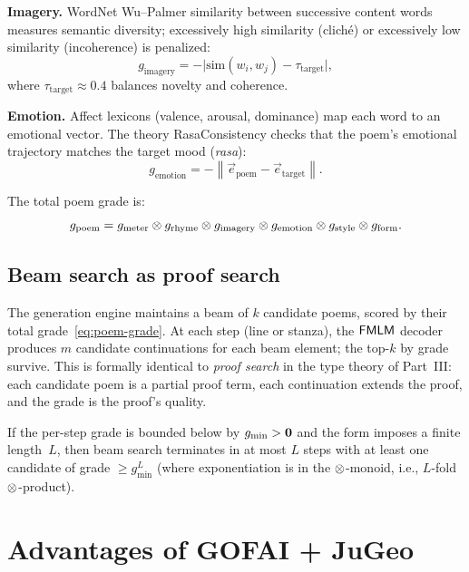\medskip\noindent\textbf{Imagery.}\;
WordNet Wu--Palmer similarity between successive content words
measures semantic diversity; excessively high similarity (clich\'e)
or excessively low similarity (incoherence) is penalized:
\[
  g_{\mathrm{imagery}} = -\bigl\lvert
    \mathrm{sim}(w_i, w_j) - \tau_{\mathrm{target}} \bigr\rvert,
\]
where $\tau_{\mathrm{target}} \approx 0.4$ balances novelty and
coherence.

\medskip\noindent\textbf{Emotion.}\;
Affect lexicons (valence, arousal, dominance) map each word to an
emotional vector.  The theory \textsf{RasaConsistency} checks that
the poem's emotional trajectory matches the target
mood (\emph{rasa}):
\[
  g_{\mathrm{emotion}} = -\left\lVert
    \vec{e}_{\mathrm{poem}} - \vec{e}_{\mathrm{target}}
  \right\rVert.
\]

The total poem grade is:
\begin{equation}
\label{eq:poem-grade}
  g_{\mathrm{poem}} = g_{\mathrm{meter}} \otimes g_{\mathrm{rhyme}}
    \otimes g_{\mathrm{imagery}} \otimes g_{\mathrm{emotion}}
    \otimes g_{\mathrm{style}} \otimes g_{\mathrm{form}}.
\end{equation}

\subsection{Beam search as proof search}
\label{ssec:beam-search}

The generation engine maintains a beam of $k$ candidate poems,
scored by their total grade~\eqref{eq:poem-grade}.  At each
step (line or stanza), the $\mathsf{FMLM}$ decoder produces $m$ candidate
continuations for each beam element; the top-$k$ by grade survive.
This is formally identical to \emph{proof search} in the type
theory of Part~III: each candidate poem is a partial proof term,
each continuation extends the proof, and the grade is the
proof's quality.

\begin{proposition}
\label{prop:beam-convergence}
If the per-step grade is bounded below by $g_{\min} > \mathbf{0}$ and
the form imposes a finite length~$L$, then beam search terminates
in at most $L$ steps with at least one candidate of grade
$\geq g_{\min}^L$ (where exponentiation is in the $\otimes$-monoid,
i.e., $L$-fold $\otimes$-product).
\end{proposition}

\section{Advantages of GOFAI + JuGeo}
\label{sec:gofai-advantages}

